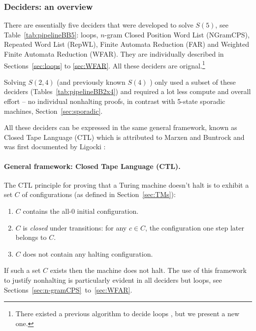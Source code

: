 \newpage

\subsubsection{Deciders: an overview}\label{sec:deciders-overview}

There are essentially five deciders that were developed to solve $S(5)$, see Table~\ref{tab:pipelineBB5}: loops, $n$-gram Closed Position Word List (NGramCPS), Repeated Word List (RepWL), Finite Automata Reduction (FAR) and Weighted Finite Automata Reduction (WFAR). They are individually described in Sections~\ref{sec:loops} to \ref{sec:WFAR}. All these deciders are orignal.\footnote{There existed a previous algorithm to decide loops \cite{Lin1963}, but we present a new one.}



Solving $S(2,4)$ (and previously known $S(4)$ \cite{Brady83}) only used  a subset of these deciders (Tables~\ref{tab:pipelineBB2x4}) and required a lot less compute and overall effort -- \eg no individual nonhalting proofs, in contrast with 5-state sporadic machines, Section~\ref{sec:sporadic}.

All these deciders can be expressed in the same general framework, known as Closed Tape Language (CTL) which is attributed to Marxen and Buntrock and was first documented by Ligocki \cite{ShawnCTL}:

\paragraph{General framework: Closed Tape Language (CTL).} The CTL principle for proving that a Turing machine doesn't halt is to exhibit a set $C$ of configurations (as defined in Section~\ref{sec:TMs}):
\begin{enumerate}
    \item $C$ contains the all-0 initial configuration.
    \item $C$ is \textit{closed} under transitions: for any $c \in C$, the configuration one step later belongs to $C$.
    \item $C$ does not contain any halting configuration.
\end{enumerate}


If such a set $C$ exists then the machine does not halt. The use of this framework to justify nonhalting is particularly evident in all deciders but loops, see Sections~\ref{sec:n-gramCPS}~to~\ref{sec:WFAR}.


